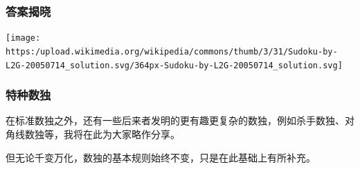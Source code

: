 \documentclass[xcolor=table]{beamer}
\begin{document}
\begin{mdframe}%

\frametitle{答案揭晓}\label{heading-section}%

\begin{mdcenter}%

\mdhr{}%

\noindent{}\texttt{[image: https:/upload.wikimedia.org/wikipedia/commons/thumb/3/31/Sudoku-by-L2G-20050714\_solution.svg/364px-Sudoku-by-L2G-20050714\_solution.svg]}{}%

\mdhr{}%
\end{mdcenter}%
\end{mdframe}\label{section}%

\begin{mdframe}%

\frametitle{特种数独}\label{heading-section}%

\noindent{}在标准数独之外，还有一些后来者发明的更有趣更复杂的数独，例如杀手数独、对角线数独等，我将在此为大家略作分享。%

但无论千变万化，数独的基本规则始终不变，只是在此基础上有所补充。%
\end{mdframe}\label{section}%
\end{document}
